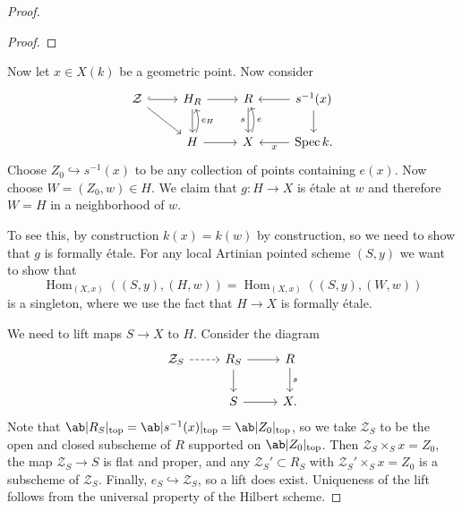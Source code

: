 \documentclass{amsart}
\theoremstyle{definition}
\theoremstyle{remark}
\theoremstyle{plain}
\theoremstyle{definition}
\theoremstyle{remark}
\newcommand{\mc}[1]{\mathcal{#1}}
\newcommand{\on}[1]{\operatorname{#1}}
\newcommand{\1}{\mathbf{1}}
\newcommand{\2}{\mathbf{2}}
\newcommand{\3}{\mathbf{3}}
\DeclareMathOperator{\Hom}{Hom}
\DeclareMathOperator{\Spec}{Spec}
\begin{document}
\begin{proof}
\begin{proof}
    \end{proof}
    Now let \(x \in X(k)\) be a geometric point. Now consider
    \begin{equation*}
    \begin{tikzcd}
        \mc{Z} \ar[hookrightarrow]{r} \ar{dr}&  H_R \ar{d} \ar{r} & R \ar{d}[swap]{s} & s^{-1}(x) \ar{d} \ar{l} \\
        & H \ar{r} \ar[bend right=20]{u}[swap]{e_H} & X \ar[bend right=20]{u}[swap]{e} & \Spec k \ar{l}{x}.
    \end{tikzcd}
    \end{equation*}
    Choose \(Z_0 \hookrightarrow s^{-1}(x)\) to be any collection of points containing \(e(x)\). Now choose \(W = (Z_0, w) \in H\). We claim that \(g \colon H \to X\) is \'etale at \(w\) and therefore \(W = H\) in a neighborhood of \(w\). 

    To see this, by construction \(k(x) = k(w)\) by construction, so we need to show that \(g\) is formally \'etale. For any local Artinian pointed scheme \((S, y)\) we want to show that
    \[ \Hom_{(X,x)}((S,y), (H,w)) = \Hom_{(X,x)} ((S,y), (W,w)) \]
    is a singleton, where we use the fact that \(H \to X\) is formally \'etale.

    We need to lift maps \(S \to X\) to \(H\). Consider the diagram
    \begin{equation*}
    \begin{tikzcd}
        \mc{Z}_S \ar[dashed]{r} & R_S \ar{r} \ar{d} & R \ar{d}{s} \\
        & S \ar{r} & X.
    \end{tikzcd}
    \end{equation*}
    Note that \(\ab|R_S|_{\on{top}} = \ab|s^{-1}(x)|_{\on{top}} = \ab|Z_0|_{\on{top}}\), so we take \(\mc{Z}_S\) to be the open and closed subscheme of \(R\) supported on \(\ab|Z_0|_{\on{top}}\). Then \(\mc{Z}_S \times_S x = Z_0\), the map \(\mc{Z}_S \to S\) is flat and proper, and any \(\mc{Z}_S' \subset R_S\) with \(\mc{Z}_S' \times_S x = Z_0\) is a subscheme of \(\mc{Z}_S\). Finally, \(e_S \hookrightarrow \mc{Z}_S\), so a lift does exist. Uniqueness of the lift follows from the universal property of the Hilbert scheme.


\end{proof}
\end{document}

